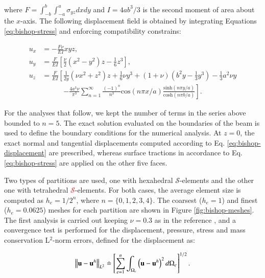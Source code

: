 \documentclass[english,11pt,3p,number,sort&compress]{elsarticle}
\begin{document}
\noindent where $F=\int_{-b}^{b}\int_{-a}^{a}\sigma_{yz}dxdy$ and $I=4ab^3/3$ is the second moment of area about the $x$-axis. The following displacement field is obtained by integrating Equations \eqref{eq:bishop-stress} and enforcing compatibility constrains:

\begin{equation} \label{eq:bishop-displacement}
	\begin{split}
		u_x & = -\frac{F\nu}{EI} xyz \text{,}\\
		u_y & = \frac{F}{EI} \left[ \frac{\nu}{2}\left(x^2-y^2\right)z - \frac{1}{6}z^3 \right] \text{,}\\
		u_z & = \frac{F}{EI} \left[ \frac{1}{2y}\left(\nu x^2+z^2\right)z + \frac{1}{6}\nu y^3 +(1+\nu) \left(b^2 y -\frac{1}{3}y^3\right) -\frac{1}{3}a^2 \nu y \right. \\
		&\qquad\quad \left.-\frac{4a^3\nu}{\pi^3} \sum_{n=1}^{\infty} \frac{(-1)^n}{n^3} \text{cos}\left(n\pi x/a\right) \frac{\text{sinh}\left( n\pi y/a \right)}{\text{cosh}\left( n\pi b/a \right)} \right] \text{.}
	\end{split}
\end{equation}

For the analyses that follow, we kept the number of terms in the series above bounded to $n=5$. The exact solution evaluated on the boundaries of the beam is used to define the boundary conditions for the numerical analysis. At $z=0$, the exact normal and tangential displacements computed according to Eq. \eqref{eq:bishop-displacement} are prescribed, whereas surface tractions in accordance to Eq. \eqref{eq:bishop-stress} are applied on the other five faces.

Two types of partitions are used, one with hexahedral $\mathcal{S}$-elements and the other one with tetrahedral \textcolor{red}{$\mathcal{S}$}-elements. For both cases, the average element size is computed as $h_e=1/2^{n}$, where $n=\{0,1,2,3,4\}$. The coarsest ($h_e=1$) and finest ($h_e=0.0625$) meshes for each partition are shown in Figure \ref{fig:bishop-meshes}. The first analysis is carried out keeping $\nu=0.3$ as in the reference \cite{bishop2014displacement}, and a convergence test is performed for the displacement, pressure, stress and mass conservation L$^2$-norm errors, defined for the displacement as:

\begin{equation} \label{eq:bishop-errors}
	\left\| \mathbf{u} - \mathbf{u}^h \right\|_{L^2} \doteq \left[ \sum_{e=1}^{n} \int_{\Omega_e} \left(\mathbf{u} - \mathbf{u}^h\right)^2 d\Omega_e\right]^{1/2} \text{.}\\
\end{equation}
\end{document}
